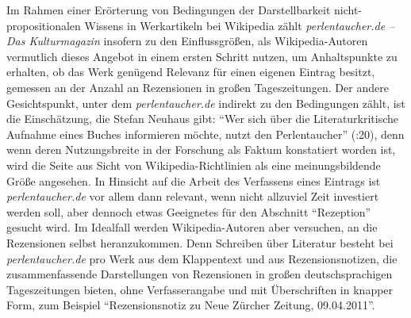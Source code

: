\documentclass[fontsize=12pt]{scrartcl}
\begin{document}
Im Rahmen einer Er\"orterung von Bedingungen der Darstellbarkeit nicht-proposi\-tionalen Wissens in Werkartikeln bei Wi\-ki\-pe\-dia z\"ahlt \textit{per\-len\-tau\-cher.de -- Das Kulturmagazin} insofern zu den Einflussgr\"o{\ss}en, als Wi\-ki\-pe\-dia-Autoren\textsuperscript{\tiny *} vermutlich dieses Angebot in einem ersten Schritt nutzen, um Anhaltspunkte zu erhalten, ob das Werk gen\"ugend Relevanz f\"ur einen eigenen Eintrag besitzt, gemessen an der Anzahl an Rezensionen in gro{\ss}en Tageszeitungen. Der andere Gesichtspunkt, unter dem \textit{per\-len\-tau\-cher.de} indirekt zu den Bedingungen z\"ahlt, ist die Einsch\"atzung, die Stefan Neuhaus gibt: "`Wer sich \"uber die Li\-te\-ra\-tur\-kritische Aufnahme eines Buches informieren m\"ochte, nutzt den \flq Per\-len\-tau\-cher\frq"' (\cite{Neuhaus2010}:20), denn wenn deren Nutzungs\-brei\-te in der For\-schung als Faktum konstatiert worden ist, wird die Seite aus Sicht von Wi\-ki\-pe\-dia-Richtlinien als eine meinungsbildende Gr\"o{\ss}e angesehen. In Hinsicht auf die Arbeit des Verfassens eines Eintrags ist \textit{per\-len\-tau\-cher.de} vor allem dann relevant, wenn nicht allzuviel Zeit investiert werden soll, aber dennoch etwas Ge\-eig\-netes f\"ur den Abschnitt "`Rezeption"' gesucht wird. Im Idealfall werden Wi\-ki\-pe\-dia-Autoren\textsuperscript{\tiny *} aber versuchen, an die Rezensionen \mbox{selbst} heranzukommen. Denn Schrei\-ben \"uber Li\-te\-ra\-tur be\-steht bei \textit{per\-len\-tau\-cher.de} pro Werk aus dem Klappentext und aus Rezensionsnotizen, die zusammenfassende Darstellungen von Rezensionen in gro{\ss}en deutschspra\-chi\-gen Tageszeitungen bieten, ohne Verfasser\textsuperscript{\tiny *}angabe und mit \"Uber\-schrif\-ten in knapper Form, zum Beispiel "`Rezensionsnotiz zu Neue Z\"urcher Zeitung, 09.04.2011"'.
 
\end{document}
